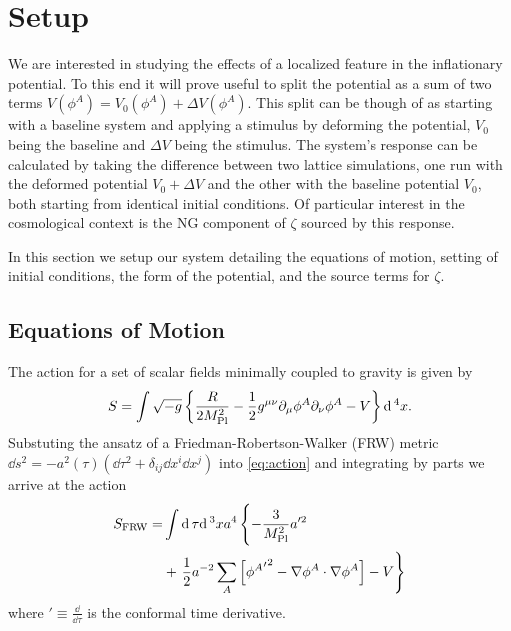 
\section{Setup} \label{sec:setup}
We are interested in studying the effects of a localized feature in the inflationary potential.
To this end it will prove useful to split the potential as a sum of two terms $V(\phi^A) = V_0(\phi^A) + \Delta V(\phi^A)$.
This split can be though of as starting with a baseline system and applying a stimulus by deforming the potential, $V_0$ being the baseline and $\Delta V$ being the stimulus.
The system's response can be calculated by taking the difference between two lattice simulations, one run with the deformed potential $V_0+\Delta V$ and the other with the baseline potential $V_0$, both starting from identical initial conditions.
Of particular interest in the cosmological context is the NG component of $\zeta$ sourced by this response.

In this section we setup our system detailing the equations of motion, setting of initial conditions, the form of the potential, and the source terms for $\zeta$.

\subsection{Equations of Motion}

The action for a set of scalar fields minimally coupled to gravity is given by
\begin{equation} \label{eq:action}
  S = \int \sqrt{-g}\left\{\frac{R}{2M_{\mathrm{Pl}}^2} - \frac{1}{2}g^{\mu\nu}\partial_\mu\phi^A\partial_\nu\phi^A - V \right\}\mathrm{d}\,^4x.
\end{equation} 
Substuting the ansatz of a Friedman-Robertson-Walker (FRW) metric $\dd s^2 = -a^2(\tau)\left( \dd\tau^2 + \delta_{ij}\dd x^i\dd x^j \right)$ into \eqref{eq:action} and integrating by parts we arrive at the action
\begin{align} \label{eq:actionFRW}
  \begin{split}
    S_{\mathrm{FRW}} = &\int \mathrm{d}\,\tau\mathrm{d}\,^3xa^4\left\{
    - \frac{3}{M_{\mathrm{Pl}}^2}a'^2 \vphantom{\sum_A}\right. \\
    & + \left.\frac{1}{2}a^{-2}\sum_A\left[{{\phi^A}'}^2
      - \nabla\phi^A\cdot\nabla\phi^A\right]
    - V \right\}
    \end{split}
\end{align}
where ${}' \equiv \frac{\dd}{\dd\tau}$ is the conformal time derivative.
  
